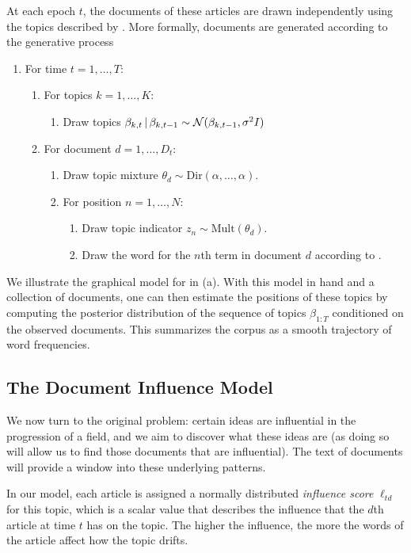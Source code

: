 At each epoch $t$, the documents of these articles are drawn independently
using the topics described by .  More formally, documents
are generated according to the generative process
\begin{enumerate}
\item For time $t=1, \ldots, T$:
  \begin{enumerate}
  \item For topics $k=1, \ldots, K$:
    \begin{enumerate}
    \item Draw topics $\beta_{k,t} \, | \, \beta_{k,t-1} \sim \mathcal{N}(\beta_{k,t-1}, \sigma^2 I)$
    \end{enumerate}
  \item For document $d=1, \ldots, D_t$:
    \begin{enumerate}
    \item Draw topic mixture $\theta_d \sim \mbox{Dir}(\alpha, \ldots, \alpha)$.
    \item For position $n=1, \ldots, N$:
      \begin{enumerate}
      \item Draw topic indicator $z_n \sim \mbox{Mult}(\theta_d)$.
      \item Draw the word for the $n$th term in document $d$ according to .
      \end{enumerate}
    \end{enumerate}
  \end{enumerate}
\end{enumerate}

We illustrate the graphical model for in  (a). With this
model in hand and a collection of documents, one can then estimate the
positions of these topics by computing the posterior distribution of
the sequence of topics $\beta_{1:T}$ conditioned on the observed
documents.  This summarizes the corpus as a smooth trajectory of word
frequencies.

\subsection*{The Document Influence Model}
We now turn to the original problem: certain ideas are influential in
the progression of a field, and we aim to discover what these ideas
are (as doing so will allow us to find those documents that are
influential).  The text of documents will provide a window into these
underlying patterns.

In our model, each article is assigned a normally distributed
\textit{influence score} $\ell_{td}$ for this topic, which is a scalar
value that describes the influence that the $d$th article at time $t$
has on the topic.  The higher the influence, the more the words of the
article affect how the topic drifts.

